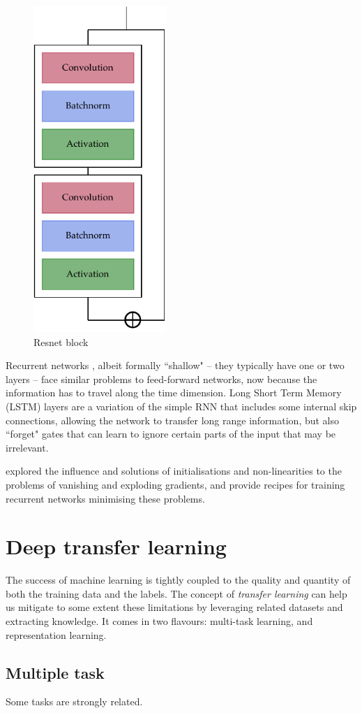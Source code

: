 \begin{figure}[tb]
	\centering
	\includegraphics[width=0.45\textwidth]{machine_learning/figures/resnet}
	\caption{Resnet block}\label{fig:resnet}
\end{figure}

Recurrent networks , albeit formally ``shallow" -- they typically have one or two layers -- face similar problems to feed-forward networks, now because the information has to travel along the time dimension.
Long Short Term Memory (LSTM) layers are a variation of the simple RNN that includes some internal skip connections, allowing the network to transfer long range information, but also ``forget" gates that can learn to ignore certain parts of the input that may be irrelevant.

\citet{difficult_recurrent} explored the influence and solutions of initialisations and non-linearities to the problems of vanishing and exploding gradients, and provide recipes for training recurrent networks minimising these problems.


\section{Deep transfer learning}
The success of machine learning is tightly coupled to the quality and quantity of both the training data and the labels.
The concept of \emph{transfer learning} can help us mitigate to some extent these limitations by leveraging related datasets and extracting knowledge.
It comes in two flavours: multi-task learning, and representation learning.

\subsection{Multiple task}
Some tasks are strongly related.
